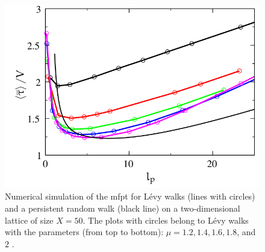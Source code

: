 \begin{figure}[bth]
 \myfloatalign
 \includegraphics[width=0.8\linewidth]{gfx/tejedor-levy}
 \caption[]{Numerical simulation of the \ac{mfpt} for Lévy walks (lines with circles) and a persistent random walk (black line) on a two-dimensional lattice of size $X=50$. The plots with circles belong to Lévy walks with the parameters (from top to bottom): $\mu = 1.2, 1.4, 1.6, 1.8$, and $2$ \cite{tejedor:2012}.}\label{fig:tejedor-levy}
\end{figure}

